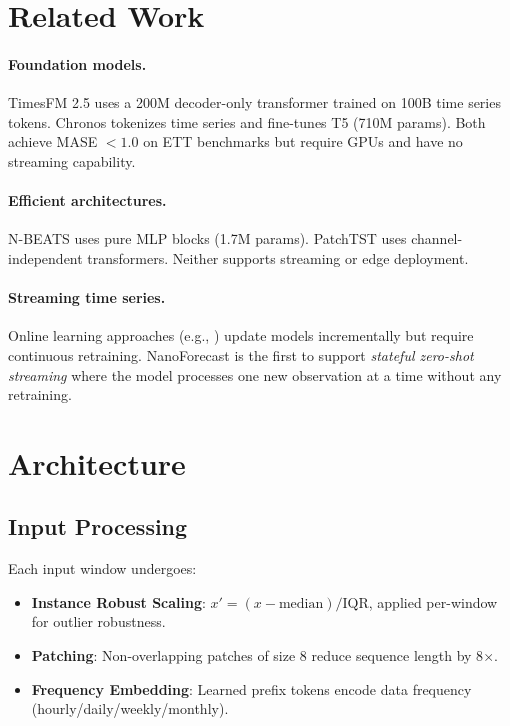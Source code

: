 \documentclass[11pt]{article}
\begin{document}
\section{Related Work}

\paragraph{Foundation models.}
TimesFM 2.5 \cite{timesfm} uses a 200M decoder-only transformer trained on 100B time series tokens. Chronos \cite{chronos} tokenizes time series and fine-tunes T5 (710M params). Both achieve MASE $<1.0$ on ETT benchmarks but require GPUs and have no streaming capability.

\paragraph{Efficient architectures.}
N-BEATS \cite{nbeats} uses pure MLP blocks (1.7M params). PatchTST \cite{patchtst} uses channel-independent transformers. Neither supports streaming or edge deployment.

\paragraph{Streaming time series.}
Online learning approaches (e.g., \cite{online_ts}) update models incrementally but require continuous retraining. NanoForecast is the first to support \emph{stateful zero-shot streaming} where the model processes one new observation at a time without any retraining.

\section{Architecture}

\subsection{Input Processing}
Each input window undergoes:
\begin{itemize}
    \item \textbf{Instance Robust Scaling}: $x' = (x - \text{median}) / \text{IQR}$, applied per-window for outlier robustness.
    \item \textbf{Patching}: Non-overlapping patches of size 8 reduce sequence length by 8$\times$.
    \item \textbf{Frequency Embedding}: Learned prefix tokens encode data frequency (hourly/daily/weekly/monthly).
\end{itemize}
\end{document}
